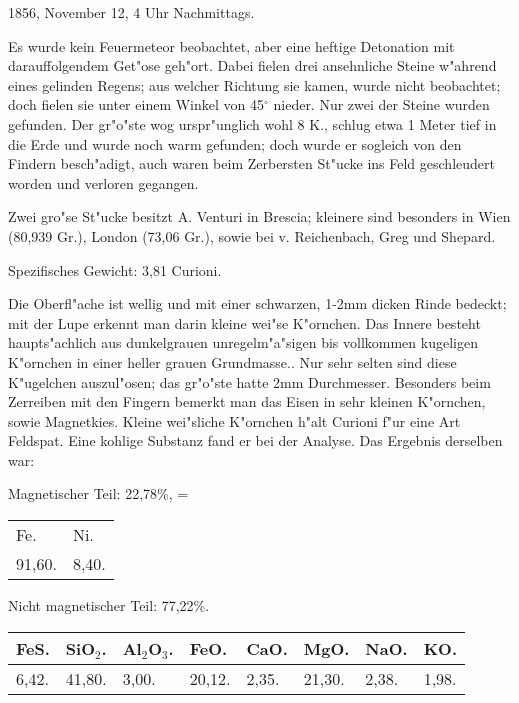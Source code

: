 \documentclass[a4paper, 11pt, oneside]{article}
\begin{document}
1856, November 12, 4 Uhr Nachmittags.

Es wurde kein Feuermeteor beobachtet, aber eine heftige Detonation mit darauffolgendem Get"ose geh"ort. Dabei fielen drei ansehnliche Steine w"ahrend eines gelinden Regens; aus welcher Richtung sie kamen, wurde nicht beobachtet; doch fielen sie unter einem Winkel von 45$^\circ$ nieder. Nur zwei der Steine wurden gefunden. Der gr"o"ste wog urspr"unglich wohl 8 K., schlug etwa 1 Meter tief in die Erde und wurde noch warm gefunden; doch wurde er sogleich von den Findern besch"adigt, auch waren beim Zerbersten St"ucke ins Feld geschleudert worden und verloren gegangen.

Zwei gro"se St"ucke besitzt A. Venturi in Brescia; kleinere sind besonders in Wien (80,939 Gr.), London (73,06 Gr.), sowie bei v. Reichenbach, Greg und Shepard.

Spezifisches Gewicht: 3,81 Curioni.

Die Oberfl"ache ist wellig und mit einer schwarzen, 1-2mm dicken Rinde bedeckt; mit der Lupe erkennt man darin kleine wei"se K"ornchen. Das Innere besteht haupts"achlich aus dunkelgrauen unregelm"a"sigen bis vollkommen kugeligen K"ornchen in einer heller grauen Grundmasse.. Nur sehr selten sind diese K"ugelchen auszul"osen; das gr"o"ste hatte 2mm Durchmesser. Besonders beim Zerreiben mit den Fingern bemerkt man das Eisen in sehr kleinen K"ornchen, sowie Magnetkies. Kleine wei"sliche K"ornchen h"alt Curioni f"ur eine Art Feldspat. Eine kohlige Substanz fand er bei der Analyse. Das Ergebnis derselben war:

\begin{center}
Magnetischer Teil: 22,78\%, =
\end{center}

\begin{table}[H]
    \centering
    \begin{tabular}{l l}
        Fe. & Ni. \\
        91,60. & 8,40. \\
    \end{tabular}
\end{table}

\begin{center}
Nicht magnetischer Teil: 77,22\%.
\end{center}

\begin{table}[H]
    \centering
    \begin{tabular}{l l l l l l l l}
        FeS. & SiO$_{2}$. & Al$_{2}$O$_{3}$. & FeO. & CaO. & MgO. & NaO. & KO. \\ \hline
        6,42. & 41,80. & 3,00. & 20,12. & 2,35. & 21,30. & 2,38. & 1,98. \\
    \end{tabular}
\end{table}
\end{document}
